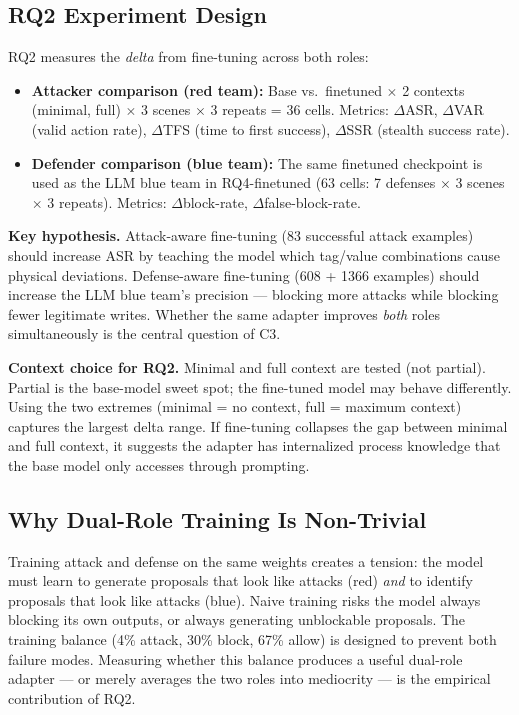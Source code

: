 \documentclass[11pt]{article}
\begin{document}
\subsection*{RQ2 Experiment Design}

RQ2 measures the \emph{delta} from fine-tuning across both roles:

\begin{itemize}[leftmargin=1.5em]
    \item \textbf{Attacker comparison (red team):} Base vs.\ finetuned $\times$ 2 contexts (minimal, full) $\times$ 3 scenes $\times$ 3 repeats = 36 cells. Metrics: $\Delta$ASR, $\Delta$VAR (valid action rate), $\Delta$TFS (time to first success), $\Delta$SSR (stealth success rate).
    \item \textbf{Defender comparison (blue team):} The same finetuned checkpoint is used as the LLM blue team in RQ4-finetuned (63 cells: 7 defenses $\times$ 3 scenes $\times$ 3 repeats). Metrics: $\Delta$block-rate, $\Delta$false-block-rate.
\end{itemize}

\textbf{Key hypothesis.} Attack-aware fine-tuning (83 successful attack examples) should increase ASR by teaching the model which tag/value combinations cause physical deviations. Defense-aware fine-tuning (608 + 1366 examples) should increase the LLM blue team's precision --- blocking more attacks while blocking fewer legitimate writes. Whether the same adapter improves \emph{both} roles simultaneously is the central question of C3.

\textbf{Context choice for RQ2.} Minimal and full context are tested (not partial). Partial is the base-model sweet spot; the fine-tuned model may behave differently. Using the two extremes (minimal = no context, full = maximum context) captures the largest delta range. If fine-tuning collapses the gap between minimal and full context, it suggests the adapter has internalized process knowledge that the base model only accesses through prompting.

\subsection*{Why Dual-Role Training Is Non-Trivial}

Training attack and defense on the same weights creates a tension: the model must learn to generate proposals that look like attacks (red) \emph{and} to identify proposals that look like attacks (blue). Naive training risks the model always blocking its own outputs, or always generating unblockable proposals. The training balance (4\% attack, 30\% block, 67\% allow) is designed to prevent both failure modes. Measuring whether this balance produces a useful dual-role adapter --- or merely averages the two roles into mediocrity --- is the empirical contribution of RQ2.
\end{document}
